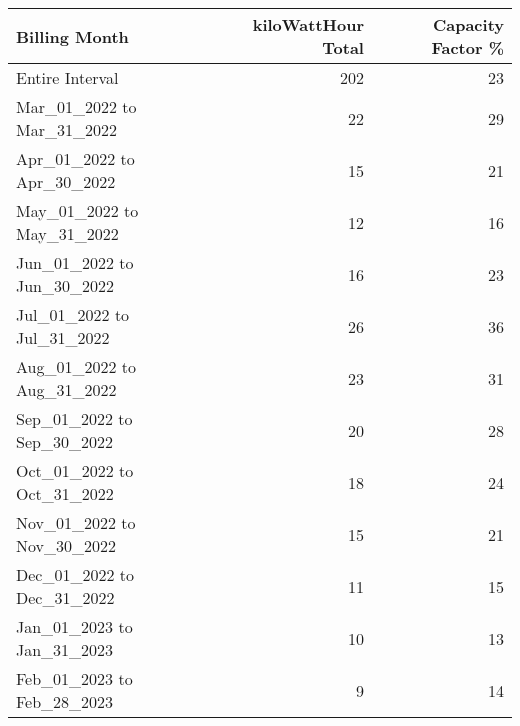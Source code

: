 \begin{tabular}{lrr}
\toprule
             Billing Month &  kiloWattHour Total &  Capacity Factor \% \\
\midrule
           Entire Interval &                 202 &                 23 \\
Mar\_01\_2022 to Mar\_31\_2022 &                  22 &                 29 \\
Apr\_01\_2022 to Apr\_30\_2022 &                  15 &                 21 \\
May\_01\_2022 to May\_31\_2022 &                  12 &                 16 \\
Jun\_01\_2022 to Jun\_30\_2022 &                  16 &                 23 \\
Jul\_01\_2022 to Jul\_31\_2022 &                  26 &                 36 \\
Aug\_01\_2022 to Aug\_31\_2022 &                  23 &                 31 \\
Sep\_01\_2022 to Sep\_30\_2022 &                  20 &                 28 \\
Oct\_01\_2022 to Oct\_31\_2022 &                  18 &                 24 \\
Nov\_01\_2022 to Nov\_30\_2022 &                  15 &                 21 \\
Dec\_01\_2022 to Dec\_31\_2022 &                  11 &                 15 \\
Jan\_01\_2023 to Jan\_31\_2023 &                  10 &                 13 \\
Feb\_01\_2023 to Feb\_28\_2023 &                   9 &                 14 \\
\bottomrule
\end{tabular}

